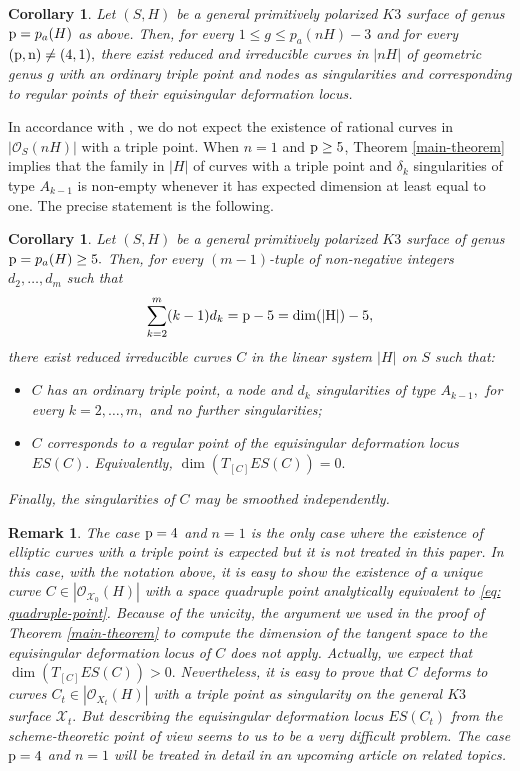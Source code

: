\documentclass[plain]{amsart}
\newtheorem{corollary}[theorem]{\textbf{Corollary}}
\newtheorem{remark}[theorem]{\textbf{Remark}}
\def\p{\rm{p}}
\begin{document}
\begin{corollary}\label{main-corollary}
Let $(S,H)$ be a general primitively polarized $K3$ surface of genus ${\p}=p_a(H)$ as above.
 Then, for every $1\leq g\leq p_a(nH)-3$ and for every $(\p,n)\neq (4,1),$ 
 there exist reduced and irreducible curves in $|nH|$
 of geometric genus $g$ with an ordinary triple point and nodes as singularities
 and corresponding to regular points of their equisingular deformation locus.
\end{corollary}
In accordance with \cite{C1}, we do not expect the existence of rational curves in $|\mathcal O_S(nH)|$
with a triple point.
When $n=1$ and $\p\geq 5$, Theorem \ref{main-theorem} implies that the family in $|H|$ of curves with a 
triple point and $\delta_k$ singularities of type $A_{k-1}$ is non-empty whenever it has expected dimension
at least equal to one. The precise statement is the following.
\begin{corollary}\label{primitive-corollary}
Let $(S,H)$ be a general primitively polarized $K3$ surface of genus ${\p}=p_a(H)\geq 5.$ Then,
for every $(m-1)$-tuple of non-negative integers $d_2,\ldots,d_m$ such that
 \begin{equation*}
\sum_{k=2}^m(k-1)d_k=\p-5=\dim(|H|)-5,
\end{equation*}
there exist reduced irreducible curves $C$ in the linear system $|H|$ on $S$ 
 such that:
 \begin{itemize}
 \item $C$ has an ordinary triple point, a node and $d_k$ singularities
 of type $A_{k-1},$ for every $k=2,\ldots,m,$ and no further singularities;
 \item  $C$ corresponds to a regular point of the equisingular deformation locus $ES(C).$ Equivalently, 
 $\dim(T_{[C]}ES(C))=0.$ 
 \end{itemize} 
 Finally, the singularities of $C$ may be smoothed independently.
\end{corollary}
\begin{remark}
The case $\p=4$ and $n=1$ is the only case where the existence of elliptic curves with 
a triple point is expected but it is not treated in this paper. In this case, with the notation above, it is 
easy to show the existence of a unique curve $C\in |\mathcal O_{\mathcal X_0}(H)|$ with a space
quadruple point analytically equivalent to \eqref{eq: quadruple-point}. Because of the unicity,
the argument we used in the proof of Theorem \ref{main-theorem} 
to compute the dimension of the tangent space to the equisingular deformation locus
of $C$ does not apply. Actually, we expect that $\dim(T_{[C]}ES(C)) >0.$ Nevertheless,
it is easy to prove that $C$ deforms to curves $C_t\in |\mathcal O_{X_t}(H)| $
with a triple point as singularity on the general $K3$ surface $\mathcal X_t.$
But describing the equisingular deformation locus $ES(C_t)$
from the scheme-theoretic point of view seems to us to be a very difficult problem.  The
case $\p=4$ and $n=1$ will be treated in detail in an upcoming article on related topics.
\end{remark}
\end{document}
